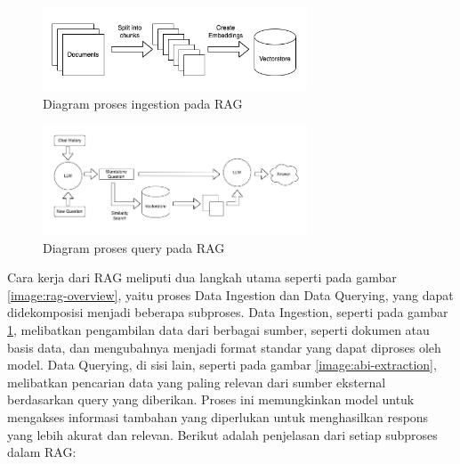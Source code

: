 \begin{figure}[ht]
	\centering
	\includegraphics[width=0.7\textwidth]{resources/chapter-2/rag-ingestion.png}
	\caption{Diagram proses ingestion pada RAG \parencite{langchain_chatgpt_data}}
	\label{image:rag-ingestion}
\end{figure}

\begin{figure}[ht]
	\centering
	\includegraphics[width=0.7\textwidth]{resources/chapter-2/rag-query.png}
	\caption{Diagram proses query pada RAG \parencite{langchain_chatgpt_data}}
	\label{image:rag-query}
\end{figure}

Cara kerja dari RAG meliputi dua langkah utama seperti pada gambar \ref{image:rag-overview}, yaitu proses Data Ingestion dan Data Querying, yang dapat didekomposisi menjadi beberapa subproses. Data Ingestion, seperti pada gambar \ref{image:rag-ingestion}, melibatkan pengambilan data dari berbagai sumber, seperti dokumen atau basis data, dan mengubahnya menjadi format standar yang dapat diproses oleh model. Data Querying, di sisi lain, seperti pada gambar \ref{image:abi-extraction}, melibatkan pencarian data yang paling relevan dari sumber eksternal berdasarkan query yang diberikan. Proses ini memungkinkan model untuk mengakses informasi tambahan yang diperlukan untuk menghasilkan respons yang lebih akurat dan relevan. Berikut adalah penjelasan dari setiap subproses dalam RAG:

